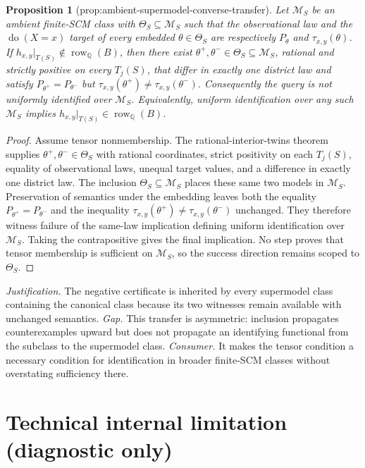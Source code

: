 \documentclass{article}
\newtheorem{proposition}{Proposition}
\begin{document}
\begin{proposition}[prop:ambient-supermodel-converse-transfer]\label{prop:ambient-supermodel-converse-transfer}
Let \(\mathcal M_S\) be an ambient finite-SCM class with \(\Theta_S\subseteq\mathcal M_S\) such that the observational law and the \(\operatorname{do}(X=x)\) target of every embedded \(\theta\in\Theta_S\) are respectively \(P_\theta\) and \(\tau_{x,y}(\theta)\).  If \(h_{x,y}|_{T(S)}\notin\operatorname{row}_{\mathbb Q}(B)\), then there exist \(\theta^+,\theta^-\in\Theta_S\subseteq\mathcal M_S\), rational and strictly positive on every \(T_j(S)\), that differ in exactly one district law and satisfy \(P_{\theta^+}=P_{\theta^-}\) but \(\tau_{x,y}(\theta^+)\ne\tau_{x,y}(\theta^-)\).  Consequently the query is not uniformly identified over \(\mathcal M_S\).  Equivalently, uniform identification over any such \(\mathcal M_S\) implies \(h_{x,y}|_{T(S)}\in\operatorname{row}_{\mathbb Q}(B)\).
\end{proposition}
\begin{proof}
Assume tensor nonmembership.  The rational-interior-twins theorem supplies \(\theta^+,\theta^-\in\Theta_S\) with rational coordinates, strict positivity on each \(T_j(S)\), equality of observational laws, unequal target values, and a difference in exactly one district law.  The inclusion \(\Theta_S\subseteq\mathcal M_S\) places these same two models in \(\mathcal M_S\).  Preservation of semantics under the embedding leaves both the equality \(P_{\theta^+}=P_{\theta^-}\) and the inequality \(\tau_{x,y}(\theta^+)\ne\tau_{x,y}(\theta^-)\) unchanged.  They therefore witness failure of the same-law implication defining uniform identification over \(\mathcal M_S\).  Taking the contrapositive gives the final implication.  No step proves that tensor membership is sufficient on \(\mathcal M_S\), so the success direction remains scoped to \(\Theta_S\).
\end{proof}
\par\smallskip\noindent \textit{Justification.} The negative certificate is inherited by every supermodel class containing the canonical class because its two witnesses remain available with unchanged semantics. \textit{Gap.} This transfer is asymmetric: inclusion propagates counterexamples upward but does not propagate an identifying functional from the subclass to the supermodel class. \textit{Consumer.} It makes the tensor condition a necessary condition for identification in broader finite-SCM classes without overstating sufficiency there.

\section*{Technical internal limitation (diagnostic only)}
\end{document}
